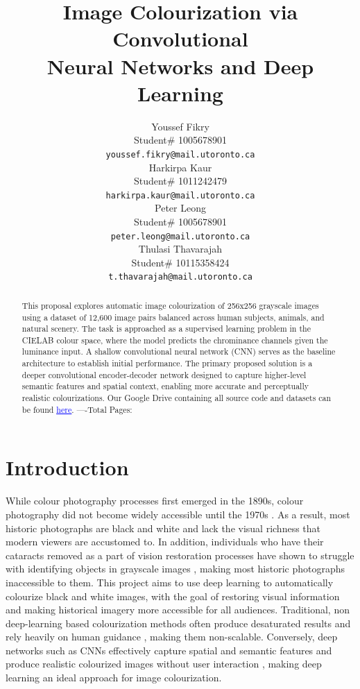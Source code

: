 \documentclass{article} %
\title{Image Colourization via Convolutional \\
Neural Networks and Deep Learning}
\author{Youssef Fikry  \\
Student\# 1005678901\\
\texttt{youssef.fikry@mail.utoronto.ca} \\
\And Harkirpa Kaur  \\
Student\# 1011242479 \\
\texttt{harkirpa.kaur@mail.utoronto.ca} \\
\AND
Peter Leong \\
Student\# 1005678901 \\
\texttt{peter.leong@mail.utoronto.ca} \\
\And
Thulasi Thavarajah \\
Student\# 10115358424 \\
\texttt{t.thavarajah@mail.utoronto.ca} \\
\AND
}
\begin{document}
\maketitle

\begin{abstract}
This proposal explores automatic image colourization of 256x256 grayscale images using a dataset of 12,600 image pairs balanced across human subjects, animals, and natural scenery. 
The task is approached as a supervised learning problem in the CIELAB colour space, where the model predicts the chrominance channels given the luminance input. A shallow convolutional 
neural network (CNN) serves as the baseline architecture to establish initial performance. The primary proposed solution is a deeper convolutional encoder-decoder network designed to 
capture higher-level semantic features and spatial context, enabling more accurate and perceptually realistic colourizations. Our Google Drive containing all source code and datasets 
can be found \href{https://drive.google.com/drive/folders/1cV1NhlQ8UTk_CgJdwhqeRu0z5xE85ZsI?usp=sharing}{\textcolor{blue}{\uline{here}}}.
----Total Pages: \pageref{last_page}
\end{abstract}


\section{Introduction}

While colour photography processes first emerged in the 1890s, colour photography did not become widely accessible until the 1970s \cite{scienceandmediamuseum2020}. As a result, 
most historic photographs are black and white and lack the visual richness that modern viewers are accustomed to. In addition, individuals who have their cataracts 
removed as a part of vision restoration processes have shown to struggle with identifying objects in grayscale images \cite{vogelsang2024impact}, making most historic photographs 
inaccessible to them. This project aims to use deep learning to automatically colourize black and white images, with the goal of restoring visual information and 
making historical imagery more accessible for all audiences. Traditional, non deep-learning based colourization methods often produce desaturated results and rely 
heavily on human guidance \cite{cheng2016deepcolorization}, making them non-scalable. Conversely, deep networks such as CNNs effectively capture spatial and semantic features and produce 
realistic colourized images without user interaction \cite{zhang2016colorful}, making deep learning an ideal approach for image colourization.
\end{document}
